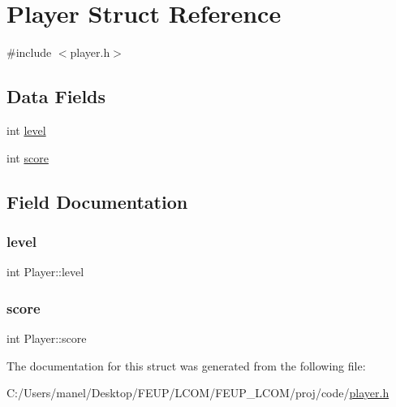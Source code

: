 \hypertarget{struct_player}{}\section{Player Struct Reference}
\label{struct_player}


{\ttfamily \#include $<$player.\+h$>$}

\subsection*{Data Fields}
\begin{DoxyCompactItemize}
\item 
int \mbox{\hyperlink{struct_player_aa1e06c89dea6981223879e6bfccdb5cd}{level}}
\item 
int \mbox{\hyperlink{struct_player_ace6abae8d66534ad0a1fd6458f786a6e}{score}}
\end{DoxyCompactItemize}


\subsection{Field Documentation}
\mbox{\label{struct_player_aa1e06c89dea6981223879e6bfccdb5cd}} 
\subsubsection{\texorpdfstring{level}{level}}
{\footnotesize\ttfamily int Player\+::level}

\mbox{\label{struct_player_ace6abae8d66534ad0a1fd6458f786a6e}} 
\subsubsection{\texorpdfstring{score}{score}}
{\footnotesize\ttfamily int Player\+::score}



The documentation for this struct was generated from the following file\+:\begin{DoxyCompactItemize}
\item 
C\+:/\+Users/manel/\+Desktop/\+F\+E\+U\+P/\+L\+C\+O\+M/\+F\+E\+U\+P\+\_\+\+L\+C\+O\+M/proj/code/\mbox{\hyperlink{player_8h}{player.\+h}}\end{DoxyCompactItemize}
